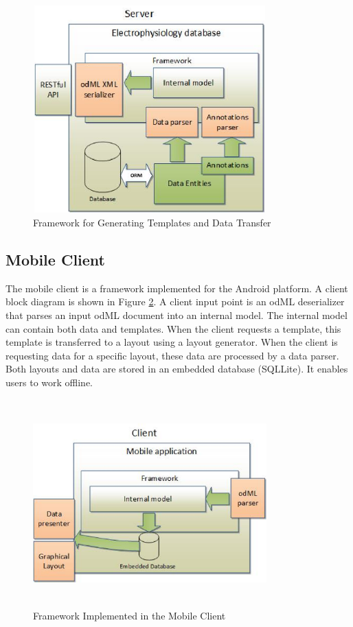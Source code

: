 \documentclass[conference]{IEEEtran}
\begin{document}
\begin{figure}
\centering\includegraphics[width=9cm, height=8cm]{Framework}
\caption{\label{framework}Framework for Generating Templates and Data Transfer}

\end{figure}


\subsection{Mobile Client}

The mobile client is a framework implemented for the Android platform. A client block diagram is shown in Figure \ref{client}. A client input point is an odML deserializer that parses an input odML document into an internal model. The internal model can contain both data and templates. When the client requests a template, this template is transferred to a layout using a layout generator. When the client is requesting data for a specific layout, these data are processed by a data parser. Both layouts and data are stored in an embedded database (SQLLite). It enables users to work offline.

\begin{figure}
\centering\includegraphics[width=9cm, height=8cm]{Client}
\caption{\label{client}Framework Implemented in the Mobile Client}

\end{figure}
\end{document}
